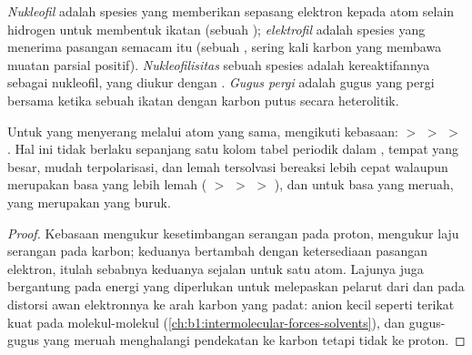 \begin{definition}\label{def:b1:electronic-effects:nucleophile}
\emph{Nukleofil} adalah spesies yang memberikan sepasang
elektron kepada atom selain hidrogen untuk membentuk ikatan (sebuah ); \emph{elektrofil} adalah spesies yang menerima
pasangan semacam itu (sebuah , sering kali karbon yang membawa
muatan parsial positif). \emph{Nukleofilisitas}
sebuah spesies adalah kereaktifannya sebagai nukleofil, yang diukur
dengan . \emph{Gugus pergi} adalah gugus
yang pergi bersama  ketika sebuah ikatan dengan
karbon putus secara heterolitik.
\end{definition}

\begin{proposition}\label{prop:b1:electronic-effects:nucleophilicity-basicity}
Untuk  yang menyerang melalui atom yang sama,
 mengikuti kebasaan:  $>$  $>$
 $>$ . Hal ini tidak berlaku sepanjang satu kolom
tabel periodik dalam , tempat  yang besar, mudah
terpolarisasi, dan lemah tersolvasi bereaksi lebih cepat walaupun
merupakan basa yang lebih lemah ( $>$  $>$  $>$
), dan untuk basa yang meruah, yang merupakan  yang
buruk.
\end{proposition}

\begin{proof}
Kebasaan mengukur kesetimbangan serangan pada proton, 
mengukur laju serangan pada karbon; keduanya bertambah dengan
ketersediaan pasangan elektron, itulah sebabnya keduanya sejalan untuk
satu atom. Lajunya juga bergantung pada energi yang diperlukan untuk
melepaskan pelarut dari  dan pada distorsi awan elektronnya ke
arah karbon yang padat: anion kecil seperti  terikat kuat pada
molekul-molekul 
(\cref{ch:b1:intermolecular-forces-solvents}), dan gugus-gugus yang
meruah menghalangi pendekatan ke karbon tetapi tidak ke proton.
\end{proof}

